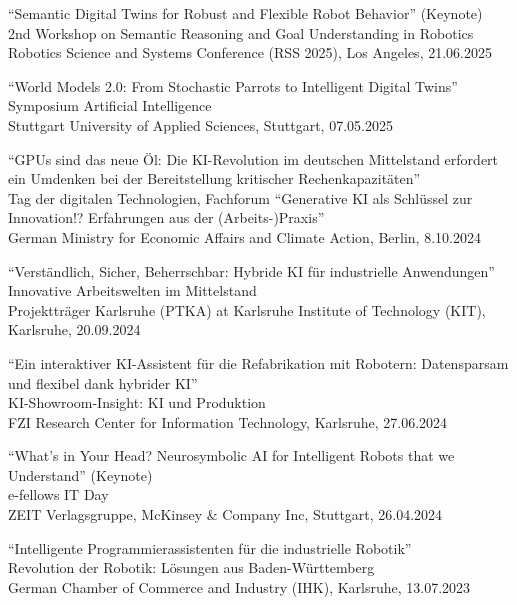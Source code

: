 \documentclass[11pt]{article} %
\begin{document}

``Semantic Digital Twins for Robust and Flexible Robot Behavior'' (Keynote)\\
2nd Workshop on Semantic Reasoning and Goal Understanding in Robotics\\
Robotics Science and Systems Conference (RSS 2025), Los Angeles, 21.06.2025

\medskip

``World Models 2.0: From Stochastic Parrots to Intelligent Digital Twins''\\
Symposium Artificial Intelligence\\
Stuttgart University of Applied Sciences, Stuttgart, 07.05.2025

\medskip


``GPUs sind das neue Öl: Die KI-Revolution im deutschen Mittelstand erfordert ein Umdenken bei der Bereitstellung kritischer Rechenkapazitäten''\\
Tag der digitalen Technologien, Fachforum ``Generative KI als Schlüssel zur Innovation!? Erfahrungen aus der (Arbeits-)Praxis''\\
German Ministry for Economic Affairs and Climate Action, Berlin, 8.10.2024

\medskip

``Verständlich, Sicher, Beherrschbar: Hybride KI für industrielle Anwendungen''\\
Innovative Arbeitswelten im Mittelstand\\
Projektträger Karlsruhe (PTKA) at Karlsruhe Institute of Technology (KIT), Karlsruhe, 20.09.2024

\medskip

``Ein interaktiver KI-Assistent für die Refabrikation mit Robotern: Datensparsam und flexibel dank hybrider KI''\\
KI-Showroom-Insight: KI und Produktion\\
FZI Research Center for Information Technology, Karlsruhe, 27.06.2024

\medskip

``What's in Your Head? Neurosymbolic AI for Intelligent Robots that we Understand'' (Keynote)\\
e-fellows IT Day\\
ZEIT Verlagsgruppe, McKinsey \& Company Inc, Stuttgart, 26.04.2024

\medskip

``Intelligente Programmierassistenten für die industrielle Robotik''\\
Revolution der Robotik: Lösungen aus Baden-Württemberg\\
German Chamber of Commerce and Industry (IHK), Karlsruhe, 13.07.2023
\end{document}
